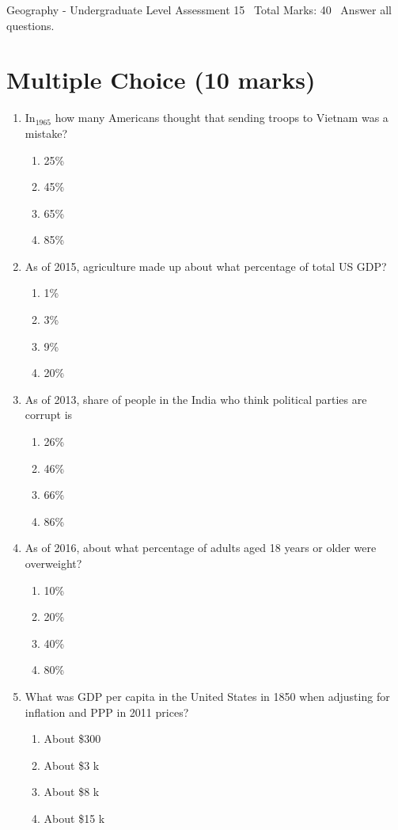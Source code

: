 \documentclass[12pt]{article}
\begin{document}
\begin{center}
Geography - Undergraduate Level Assessment 15 \
Total Marks: 40 \
Answer all questions.
\end{center}

\section*{Multiple Choice (10 marks)}
\begin{enumerate}[label=\arabic*.]
\item In$_{1965}$ how many Americans thought that sending troops to Vietnam was a mistake?
\begin{enumerate}[label=(\alph*)]
    \item 25\%
    \item 45\%
    \item 65\%
    \item 85\%
\end{enumerate}
\item As of 2015, agriculture made up about what percentage of total US GDP?
\begin{enumerate}[label=(\alph*)]
    \item 1\%
    \item 3\%
    \item 9\%
    \item 20\%
\end{enumerate}
\item As of 2013, share of people in the India who think political parties are corrupt is
\begin{enumerate}[label=(\alph*)]
    \item 26\%
    \item 46\%
    \item 66\%
    \item 86\%
\end{enumerate}
\item As of 2016, about what percentage of adults aged 18 years or older were overweight?
\begin{enumerate}[label=(\alph*)]
    \item 10\%
    \item 20\%
    \item 40\%
    \item 80\%
\end{enumerate}
\item What was GDP per capita in the United States in 1850 when adjusting for inflation and PPP in 2011 prices?
\begin{enumerate}[label=(\alph*)]
    \item About \$300
    \item About \$3 k
    \item About \$8 k
    \item About \$15 k
\end{enumerate}
\end{enumerate}
\end{document}
